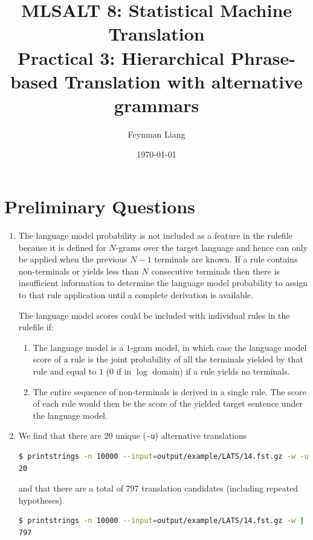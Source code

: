 \documentclass[a4paper,oneside,reqno]{amsart}
\newcommand{\authorname}{Feynman Liang}
\newcommand{\coursename}{MLSALT 8: Statistical Machine Translation}
\newcommand{\assignmentname}{Practical 3: Hierarchical Phrase-based Translation
with alternative grammars}
\begin{document}
\title{\coursename\\\assignmentname}

\author{\authorname}
\date{\today}

\maketitle

\section{Preliminary Questions}
\begin{enumerate}[label=\arabic*.]
  \item The language model probability is not included as a feature in the
    rulefile because it is defined for $N$-grams over the target language and
    hence can only be applied when the previous $N-1$ terminals are known.
    If a rule contains non-terminals or yields less than $N$ consecutive terminals
    then there is insufficient information to determine the language model probability
    to assign to that rule application until a complete derivation is available.

    The language model scores could be included with individual rules in the rulefile if:
    \begin{enumerate}
      \item The language model is a $1$-gram model, in which case the language
        model score of a rule is the joint probability of all the terminals
        yielded by that rule and equal to $1$ ($0$ if in $\log$ domain) if a
        rule yields no terminals.
      \item The entire sequence of non-terminals is derived in a single rule.
        The score of each rule would then be the score of the yielded target
        sentence under the language model.
    \end{enumerate}

  \item We find that there are $20$ unique (\texttt{-u}) alternative translations
    \begin{lstlisting}[language=bash]
$ printstrings -n 10000 --input=output/example/LATS/14.fst.gz -w -u | sed '/[EMPTY]/d' | wc -l
20
    \end{lstlisting}
    and that there are a total of 797 translation candidates (including repeated hypotheses)
    \begin{lstlisting}[language=bash]
$ printstrings -n 10000 --input=output/example/LATS/14.fst.gz -w | sed '/[EMPTY]/d' | wc -l
797
    \end{lstlisting}


\end{enumerate}
\end{document}
